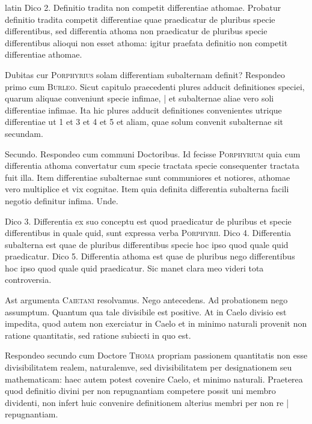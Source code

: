 \begin{otherlanguage*}{latin}
\pstart
Dico 2. Definitio tradita non competit differentiae athomae. Probatur definitio tradita competit differentiae quae praedicatur de pluribus specie differentibus, sed differentia athoma non praedicatur de pluribus specie differentibus alioqui non esset athoma:
igitur praefata definitio non competit differentiae athomae. 
\pend

\pstart
Dubitas cur \textsc{Porphyrius} solam differentiam subalternam definit? Respondeo primo cum \textsc{Burleo}. Sicut capitulo praecedenti plures adducit definitiones speciei, quarum aliquae conveniunt specie infimae, \textnormal{|} et subalternae aliae vero soli differentiae infimae. Ita hic plures adducit definitiones convenientes utrique differentiae ut 1 et 3 et 4 et 5 et aliam, quae solum convenit subalternae sit secundam. 
\pend

\pstart
Secundo. Respondeo cum communi Doctoribus. Id fecisse \textsc{Porphyrium} quia cum differentia athoma convertatur cum specie tractata specie consequenter tractata fuit illa. Item differentiae subalternae sunt communiores et notiores, athomae vero multiplice et vix cognitae. Item quia definita differentia subalterna facili negotio definitur infima. Unde. 
\pend

\pstart
Dico 3. Differentia ex suo conceptu est quod praedicatur de pluribus et specie differentibus in quale quid, sunt expressa verba \textsc{Porphyrii}. Dico 4. Differentia subalterna est quae de pluribus differentibus specie hoc ipso quod quale quid praedicatur. Dico 5. Differentia athoma est quae de pluribus nego differentibus hoc ipso quod quale quid praedicatur. Sic manet clara meo videri tota controversia. 
\pend

\pstart
Ast argumenta \textsc{Caietani} resolvamus. Nego antecedens. Ad probationem nego assumptum. Quantum qua tale divisibile est positive. At in Caelo divisio est impedita, quod autem non exerciatur in Caelo et in minimo naturali provenit non ratione quantitatis, sed ratione subiecti in quo est. 
\pend

\pstart
Respondeo secundo cum Doctore \textsc{Thoma} propriam passionem quantitatis non esse divisibilitatem realem, naturalemve, sed divisibilitatem per designationem seu mathematicam:
haec autem potest covenire Caelo, et minimo naturali. Praeterea quod definitio divini per non repugnantiam competere possit uni membro dividenti, non infert huic convenire definitionem alterius membri per non re \textnormal{|} repugnantiam. 
\pend


\end{otherlanguage*}

